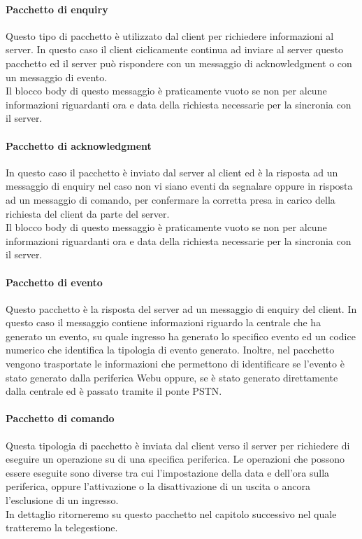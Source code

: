 \paragraph{Pacchetto di enquiry}
Questo tipo di pacchetto è utilizzato dal client per richiedere informazioni al server. In questo caso il client ciclicamente continua ad inviare al server questo pacchetto ed il server può rispondere con un messaggio di acknowledgment o con un messaggio di evento.\\
Il blocco body di questo messaggio è praticamente vuoto se non per alcune informazioni riguardanti ora e data della richiesta necessarie per la sincronia con il server.
\paragraph{Pacchetto di acknowledgment}
In questo caso il pacchetto è inviato dal server al client ed è la risposta ad un messaggio di enquiry nel caso non vi siano eventi da segnalare oppure in risposta ad un messaggio di comando, per confermare la corretta presa in carico della richiesta del client da parte del server.\\
Il blocco body di questo messaggio è praticamente vuoto se non per alcune informazioni riguardanti ora e data della richiesta necessarie per la sincronia con il server.
\paragraph{Pacchetto di evento}
Questo pacchetto è la risposta del server ad un messaggio di enquiry del client. In questo caso il messaggio contiene informazioni riguardo la centrale che ha generato un evento, su quale ingresso ha generato lo specifico evento ed un codice numerico che identifica la tipologia di evento generato. Inoltre, nel pacchetto vengono trasportate le informazioni che permettono di identificare se l'evento è stato generato dalla periferica Webu oppure, se è stato generato direttamente dalla centrale ed è passato tramite il ponte PSTN.
\paragraph{Pacchetto di comando}
Questa tipologia di pacchetto è inviata dal client verso il server per richiedere di eseguire un operazione su di una specifica periferica. Le operazioni che possono essere eseguite sono diverse tra cui l'impostazione della data e dell'ora sulla periferica, oppure l'attivazione o la disattivazione di un uscita o ancora l'esclusione di un ingresso.\\
In dettaglio ritorneremo su questo pacchetto nel capitolo successivo nel quale tratteremo la telegestione.

